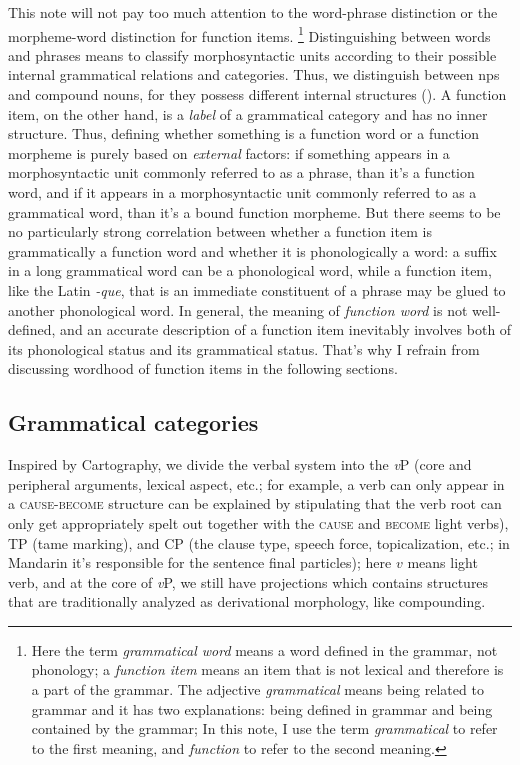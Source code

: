 \documentclass[UTF8, a4paper, oneside, scheme=plain, 12pt]{ctexrep}
\newcommand*{\term}[1]{\emph{#1}}
\newcommand{\form}[1]{\emph{#1}}
\newcommand{\vP}{\textit{v}P}
\newcommand*{\category}[1]{\textsc{#1}}
\begin{document}
{This note will not pay too much attention 
to the word-phrase distinction or the morpheme-word distinction
for function items.%
\footnote{
    Here the term \term{grammatical word} 
    means a word defined in the grammar, not phonology;
    a \term{function item} means an item that is not lexical
    and therefore is a part of the grammar. 
    The adjective \term{grammatical} means being related to grammar
    and it has two explanations:
    being defined in grammar and being contained by the grammar; 
    In this note, I use the term \term{grammatical} to refer to the first meaning, 
    and \term{function} to refer to the second meaning.
} 
Distinguishing between words and phrases 
means to classify morphosyntactic units 
according to their possible internal
grammatical relations and categories.
Thus, we distinguish between \acs{np}s and compound nouns, 
for they possess different internal structures 
().
A function item, on the other hand, is a \emph{label} of a grammatical category
and has no inner structure.
Thus, defining whether something is a function word or a function morpheme
is purely based on \emph{external} factors:
if something appears in a morphosyntactic unit commonly referred to as a phrase, 
than it's a function word, 
and if it appears in a morphosyntactic unit commonly referred to as a grammatical word, 
than it's a bound function morpheme.
But there seems to be no particularly strong correlation 
between whether a function item is grammatically a function word
and whether it is phonologically a word: 
a suffix in a long grammatical word can be a phonological word, 
while a function item, like the Latin \form{-que}, that is an immediate constituent of a phrase 
may be glued to another phonological word. 
In general, the meaning of \term{function word} is not well-defined, 
and an accurate description of a function item 
inevitably involves both of its phonological status and its grammatical status.
That's why I refrain from discussing wordhood of function items in the following sections.

\subsection{Grammatical categories}

Inspired by Cartography, 
we divide the verbal system into the \vP{} 
(core and peripheral arguments, lexical aspect, etc.;
for example, a verb can only appear in a \category{cause-become} structure 
can be explained by stipulating that 
the verb root can only get appropriately spelt out
together with the \category{cause} and \category{become} light verbs), 
TP (\ac{tame} marking), 
and CP (the clause type, speech force, topicalization, etc.; 
in Mandarin it's responsible for the sentence final particles); 
here $v$ means light verb, 
and at the core of \vP, 
we still have projections  
which contains structures that are traditionally analyzed 
as derivational morphology, 
like compounding.

}
\end{document}
